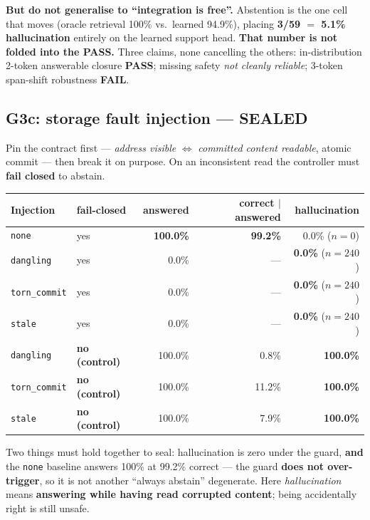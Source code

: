 \documentclass[11pt, a4paper]{article}
\newcommand{\PASS}{\textcolor{green!45!black}{\textbf{PASS}}}
\newcommand{\FAIL}{\textcolor{red!70!black}{\textbf{FAIL}}}
\newcommand{\SEALED}{\textcolor{blue!60!black}{\textbf{SEALED}}}
\begin{document}
\textbf{But do not generalise to ``integration is free''.} Abstention is the one cell that
moves (oracle retrieval 100\% vs.\ learned 94.9\%), placing \textbf{3/59 $=$ 5.1\%
hallucination} entirely on the learned support head. \textbf{That number is not folded
into the \PASS{}.} Three claims, none cancelling the others: in-distribution 2-token
answerable closure \PASS{}; missing safety \emph{not cleanly reliable}; 3-token
span-shift robustness \FAIL{}.

\subsection{G3c: storage fault injection --- \SEALED{}}

Pin the contract first --- \emph{address visible} $\Leftrightarrow$ \emph{committed
content readable}, atomic commit --- then break it on purpose. On an inconsistent read
the controller must \textbf{fail closed} to abstain.

\begin{table}[h]
\centering\small
\begin{tabular}{llrrr}
\toprule
Injection & fail-closed & answered & correct $\mid$ answered & \textbf{hallucination} \\
\midrule
\verb|none| & yes & \textbf{100.0\%} & \textbf{99.2\%} & 0.0\% ($n{=}0$) \\
\verb|dangling| & yes & 0.0\% & --- & \textbf{0.0\%} ($n{=}240$) \\
\verb|torn_commit| & yes & 0.0\% & --- & \textbf{0.0\%} ($n{=}240$) \\
\verb|stale| & yes & 0.0\% & --- & \textbf{0.0\%} ($n{=}240$) \\
\verb|dangling| & \textbf{no (control)} & 100.0\% & 0.8\% & \textbf{100.0\%} \\
\verb|torn_commit| & \textbf{no (control)} & 100.0\% & 11.2\% & \textbf{100.0\%} \\
\verb|stale| & \textbf{no (control)} & 100.0\% & 7.9\% & \textbf{100.0\%} \\
\bottomrule
\end{tabular}
\end{table}

Two things must hold together to seal: hallucination is zero under the guard,
\textbf{and} the \verb|none| baseline answers 100\% at 99.2\% correct --- the guard
\textbf{does not over-trigger}, so it is not another ``always abstain'' degenerate. Here
\emph{hallucination} means \textbf{answering while having read corrupted content}; being
accidentally right is still unsafe.
\end{document}

